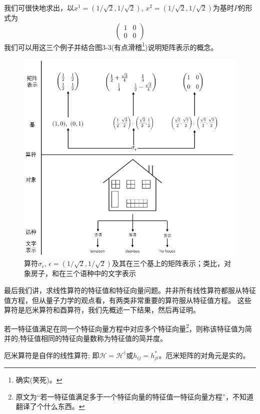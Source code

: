 我们可很快地求出，以$x^1=(1/\sqrt{2},1/\sqrt{2})$, $x^2=(1/\sqrt{2},1/\sqrt{2})$为基时$P$的形式为
\[
\begin{pmatrix}
    1 & 0 \\ 0 & 0
\end{pmatrix}    
\]
我们可以用这三个例子并结合图3-3(有点滑稽\footnote{确实(笑死)。})说明矩阵表示的概念。
\begin{figure}[htbp]
    \centering
    \includegraphics[scale=0.7]{./fig/3-3.png}
    \caption{算符$\sigma_{\epsilon}$, $\epsilon=(1/\sqrt{2},1/\sqrt{2})$及其在三个基上的矩阵表示；类比，对象房子，和在三个语种中的文字表示}
\end{figure}
最后我们讲，求线性算符的特征值和特征向量问题。井非所有线性算符都服从特征值方程，但从量子力学的观点看，有两类非常重要的算符服从特征值方程。
这些算符是厄米算符和酉算符，我们先概述一下结果，然后再证明。

\begin{definition}
    若一特征值满足在同一个特征向量方程中对应多个特征向量\footnote{原文为“若一特征值满足多于一个特征向量的特征值一特征向量方程”，不知道翻译了个什么东西。}，则称该特征值为简并的;特征值相同的特征向量数称为特征值的简并度。
\end{definition}

\begin{definition}[厄米算符]
    厄米算符是自伴的线性算符; 即$\mathscr{H}=\mathscr{H}^{\dagger}$或$h_{ij}=h_{ji}^*$。厄米矩阵的对角元是实的。
\end{definition}

